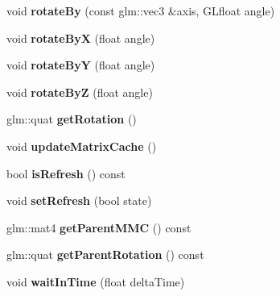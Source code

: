 \begin{DoxyCompactItemize}
void {\bfseries rotate\+By} (const glm\+::vec3 \&axis, G\+Lfloat angle)
\item 
\mbox{\label{classflw_1_1flf_1_1Moveable_adce25dc58b98fe169130c1048b819c70}} 
void {\bfseries rotate\+ByX} (float angle)
\item 
\mbox{\label{classflw_1_1flf_1_1Moveable_aa7d551d487f77303ce41ee008ecbc062}} 
void {\bfseries rotate\+ByY} (float angle)
\item 
\mbox{\label{classflw_1_1flf_1_1Moveable_afc12f5dfdbca88ab5829d59a2c9afe24}} 
void {\bfseries rotate\+ByZ} (float angle)
\item 
\mbox{\label{classflw_1_1flf_1_1Moveable_a90053792a763a549fe95ac5afa42f735}} 
glm\+::quat {\bfseries get\+Rotation} ()
\item 
\mbox{\label{classflw_1_1flf_1_1Moveable_a4bd6c8d74b1663b53b715c5e54c45262}} 
void {\bfseries update\+Matrix\+Cache} ()
\item 
\mbox{\label{classflw_1_1flf_1_1Moveable_a6e7e41bdbaa7ca1add8552ede7841058}} 
bool {\bfseries is\+Refresh} () const
\item 
\mbox{\label{classflw_1_1flf_1_1Moveable_a2d421e557a07e8de451af7bc4eafc0bd}} 
void {\bfseries set\+Refresh} (bool state)
\item 
\mbox{\label{classflw_1_1flf_1_1Moveable_a449ac7429b228840577e7fc8f4d497dd}} 
glm\+::mat4 {\bfseries get\+Parent\+M\+MC} () const
\item 
\mbox{\label{classflw_1_1flf_1_1Moveable_ac7361b660f16d600056cb69fad9e1822}} 
glm\+::quat {\bfseries get\+Parent\+Rotation} () const
\item 
\mbox{\label{classflw_1_1flf_1_1Moveable_a885c17418b87e0d41b42c6cc5f19ddc7}} 
void {\bfseries wait\+In\+Time} (float delta\+Time)
\item 
\mbox{\label{classflw_1_1flf_1_1Moveable_a8bbd482d5451416a33ea724053258180}} 

\end{DoxyCompactItemize}
